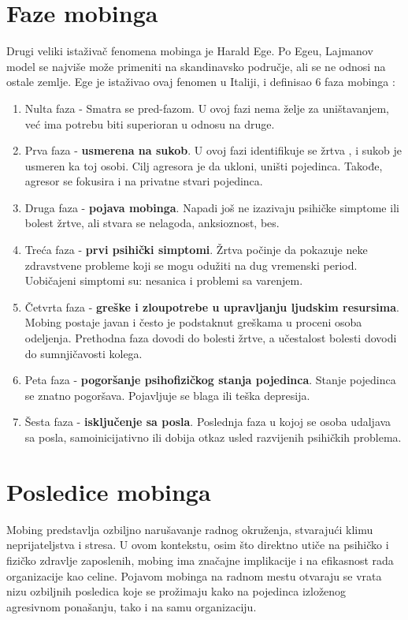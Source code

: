 \documentclass[a4paper]{article}
\begin{document}
    \section{Faze mobinga}
    Drugi veliki istaživač fenomena mobinga je Harald Ege. Po Egeu, Lajmanov model se najviše može primeniti na skandinavsko područje, ali se ne odnosi na ostale zemlje. Ege je istaživao ovaj fenomen u Italiji, i definisao 6 faza mobinga \cite{ege2000mobbing}:
    \begin{enumerate}
        \item Nulta faza - Smatra se pred-fazom. U ovoj fazi nema želje za uništavanjem, već ima potrebu biti superioran u odnosu na druge.
        \item Prva faza - \textbf{usmerena na sukob}. U ovoj fazi identifikuje se žrtva , i sukob je usmeren ka toj osobi. Cilj agresora je da ukloni, uništi pojedinca. Takođe, agresor se fokusira i na privatne stvari pojedinca.
        \item Druga faza - \textbf{pojava mobinga}. Napadi još ne izazivaju psihičke simptome ili bolest žrtve, ali stvara se nelagoda, anksioznost, bes.
        \item Treća faza - \textbf{prvi psihički simptomi}. Žrtva počinje da pokazuje neke zdravstvene probleme koji se mogu odužiti na dug vremenski period. Uobičajeni simptomi su: nesanica i problemi sa varenjem.
        \item Četvrta faza - \textbf{greške i zloupotrebe u upravljanju ljudskim resursima}. Mobing postaje javan i često je podstaknut greškama u proceni osoba odeljenja. Prethodna faza dovodi do bolesti žrtve, a učestalost bolesti dovodi do sumnjičavosti kolega.
        \item Peta faza - \textbf{pogoršanje psihofizičkog stanja pojedinca}. Stanje pojedinca se znatno pogoršava. Pojavljuje se blaga ili teška depresija.
        \item Šesta faza - \textbf{isključenje sa posla}. Poslednja faza u kojoj se osoba udaljava sa posla, samoinicijativno ili dobija otkaz usled razvijenih psihičkih problema. 
    \end{enumerate}

    \section{Posledice mobinga}
        Mobing predstavlja ozbiljno narušavanje radnog okruženja, stvarajući klimu neprijateljstva i stresa.
        U ovom kontekstu, osim što direktno utiče na psihičko i fizičko zdravlje zaposlenih, mobing ima značajne implikacije i na efikasnost rada organizacije kao celine.
        Pojavom mobinga na radnom mestu otvaraju se vrata nizu ozbiljnih posledica koje se prožimaju kako na pojedinca izloženog agresivnom ponašanju, tako i na samu organizaciju.
\end{document}
